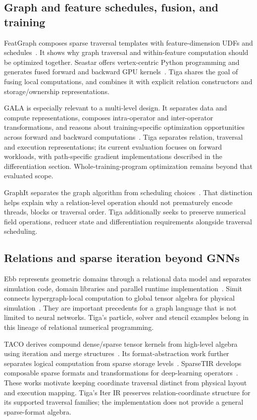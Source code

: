 \subsection{Graph and feature schedules, fusion, and training}
FeatGraph composes sparse traversal templates with feature-dimension UDFs and
schedules~\cite{featgraph}. It shows why graph traversal and within-feature
computation should be optimized together. Seastar offers vertex-centric Python
programming and generates fused forward and backward GPU kernels~\cite{seastar}.
Tiga shares the goal of fusing local computations, and combines it with
explicit relation constructors and storage/ownership representations.

GALA is especially relevant to a multi-level design. It separates data and
compute representations, composes intra-operator and inter-operator
transformations, and reasons about training-specific optimization opportunities
across forward and backward computations~\cite{gala}. Tiga separates relation,
traversal and execution representations; its current evaluation focuses on
forward workloads, with path-specific gradient implementations described in
the differentiation section. Whole-training-program optimization remains beyond
that evaluated scope.

GraphIt separates the graph algorithm from scheduling choices~\cite{graphit}.
That distinction helps explain why a relation-level operation should not
prematurely encode threads, blocks or traversal order. Tiga additionally seeks
to preserve numerical field operations, reducer state and differentiation
requirements alongside traversal scheduling.

\subsection{Relations and sparse iteration beyond GNNs}
Ebb represents geometric domains through a relational data model and separates
simulation code, domain libraries and parallel runtime implementation~\cite{ebb}.
Simit connects hypergraph-local computation to global tensor algebra for physical
simulation~\cite{simit}. They are important precedents for a graph language that
is not limited to neural networks. Tiga's particle, solver and stencil examples
belong in this lineage of relational numerical programming.

TACO derives compound dense/sparse tensor kernels from high-level algebra using
iteration and merge structures~\cite{taco}. Its format-abstraction work further
separates logical computation from sparse storage levels~\cite{sparseformats}.
SparseTIR develops composable sparse formats and transformations for deep-learning
operators~\cite{sparsetir}. These works motivate keeping coordinate traversal
distinct from physical layout and execution mapping. Tiga's Iter IR preserves
relation-coordinate structure for its supported traversal families; the
implementation does not provide a general sparse-format algebra.

